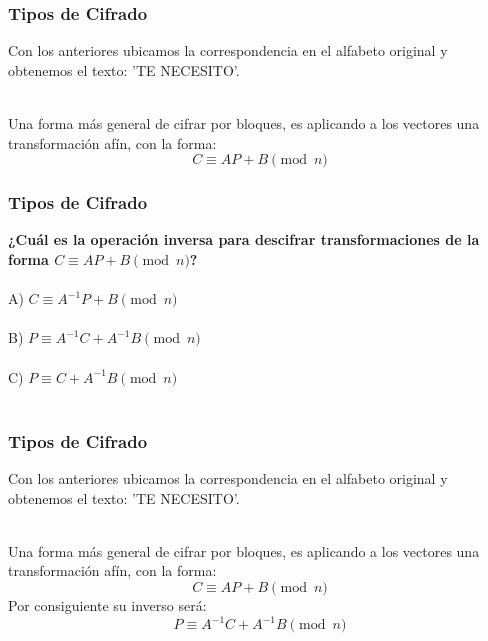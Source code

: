 \documentclass[spanish, mexico]{beamer}
\begin{document}
\begin{frame}
	\end{frame}
	
	\begin{frame}
		\frametitle{Tipos de Cifrado}
		 \begin{solution}
		    Con los anteriores ubicamos la correspondencia en el alfabeto original y obtenemos el texto: 'TE NECESITO'.\\~\\
		 \end{solution}
		 Una forma más general de cifrar por bloques, es aplicando a los vectores una transformación afín, con la forma:
		 $$C \equiv AP + B \pmod{n}$$
	\end{frame}
	
	\begin{frame}
		\frametitle{Tipos de Cifrado}
		 \textbf{¿Cuál es la operación inversa para descifrar transformaciones de la forma $C \equiv AP + B \pmod{n}$?}\\~\\
		 A) $C \equiv A^{-1}P + B $\\~\\
		 B) $P \equiv A^{-1}C + A^{-1}B $\\~\\
		 C) $P \equiv C + A^{-1}B $\\~\\
	\end{frame}
	
	\begin{frame}
		\frametitle{Tipos de Cifrado}
		 \begin{solution}
		    Con los anteriores ubicamos la correspondencia en el alfabeto original y obtenemos el texto: 'TE NECESITO'.\\~\\
		 \end{solution}
		 Una forma más general de cifrar por bloques, es aplicando a los vectores una transformación afín, con la forma:
		 $$C \equiv AP + B \pmod{n}$$
		 Por consiguiente su inverso será:
		 $$P \equiv A^{-1}C + A^{-1}B \pmod{n}$$
	\end{frame}
	
\end{document}
